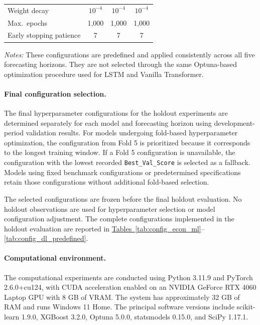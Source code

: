 \documentclass[12pt,twoside]{ord}
\begin{document}
\begin{table}[htbp]
\begin{tabular}{lccc}
Weight decay            & $10^{-4}$    & $10^{-4}$ & $10^{-4}$ \\
Max.\ epochs            & 1,000        & 1,000   & 1,000 \\
Early stopping patience & 7            & 7       & 7 \\
\hline
\end{tabular}
\par\vspace{4pt}\parbox{\linewidth}{\fontsize{9pt}{12pt}\selectfont\textit{Notes:} These configurations are predefined and applied consistently across all five forecasting horizons. They are not selected through the same Optuna-based optimization procedure used for LSTM and Vanilla Transformer.}
\end{table}

\paragraph{Final configuration selection.} The final hyperparameter configurations for the holdout experiments are determined separately for each model and forecasting horizon using development-period validation results. For models undergoing fold-based hyperparameter optimization, the configuration from Fold 5 is prioritized because it corresponds to the longest training window. If a Fold 5 configuration is unavailable, the configuration with the lowest recorded \texttt{Best\_Val\_Score} is selected as a fallback. Models using fixed benchmark configurations or predetermined specifications retain those configurations without additional fold-based selection.

The selected configurations are frozen before the final holdout evaluation. No holdout observations are used for hyperparameter selection or model configuration adjustment. The complete configurations implemented in the holdout evaluation are reported in \hyperref[tab:config_econ_ml]{Tables~\ref*{tab:config_econ_ml}}--\hyperref[tab:config_dl_predefined]{\ref*{tab:config_dl_predefined}}.

\paragraph{Computational environment.} The computational experiments are conducted using Python 3.11.9 and PyTorch 2.6.0+cu124, with CUDA acceleration enabled on an NVIDIA GeForce RTX 4060 Laptop GPU with 8 GB of VRAM. The system has approximately 32 GB of RAM and runs Windows 11 Home. The principal software versions include scikit-learn 1.9.0, XGBoost 3.2.0, Optuna 5.0.0, statsmodels 0.15.0, and SciPy 1.17.1.
\end{document}

